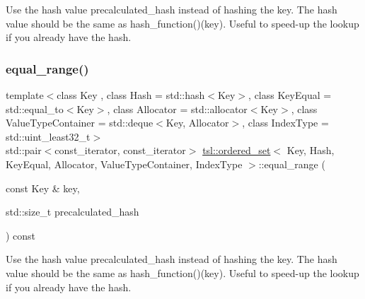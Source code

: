 Use the hash value \textquotesingle{}precalculated\+\_\+hash\textquotesingle{} instead of hashing the key. The hash value should be the same as hash\+\_\+function()(key). Useful to speed-\/up the lookup if you already have the hash. \mbox{\label{classtsl_1_1ordered__set_a3c95b8ec1f1f4432b5b26ff5a83db5b0}} 
\subsubsection{\texorpdfstring{equal\_range()}{equal\_range()}\hspace{0.1cm}{\footnotesize\ttfamily [2/6]}}
{\footnotesize\ttfamily template$<$class Key , class Hash  = std\+::hash$<$\+Key$>$, class Key\+Equal  = std\+::equal\+\_\+to$<$\+Key$>$, class Allocator  = std\+::allocator$<$\+Key$>$, class Value\+Type\+Container  = std\+::deque$<$\+Key, Allocator$>$, class Index\+Type  = std\+::uint\+\_\+least32\+\_\+t$>$ \\
std\+::pair$<$const\+\_\+iterator, const\+\_\+iterator$>$ \mbox{\hyperlink{classtsl_1_1ordered__set}{tsl\+::ordered\+\_\+set}}$<$ Key, Hash, Key\+Equal, Allocator, Value\+Type\+Container, Index\+Type $>$\+::equal\+\_\+range (\begin{DoxyParamCaption}\item[{const Key \&}]{key,  }\item[{std\+::size\+\_\+t}]{precalculated\+\_\+hash }\end{DoxyParamCaption}) const\hspace{0.3cm}{\ttfamily [inline]}}





Use the hash value \textquotesingle{}precalculated\+\_\+hash\textquotesingle{} instead of hashing the key. The hash value should be the same as hash\+\_\+function()(key). Useful to speed-\/up the lookup if you already have the hash. \mbox{\label{classtsl_1_1ordered__set_a5a2a9aca80e60c35f6a876f87015c335}} 
